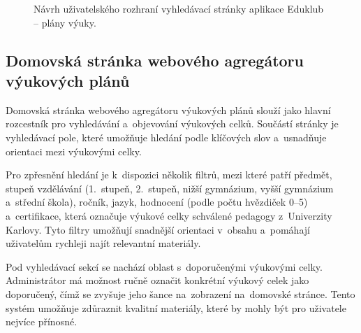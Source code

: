 \documentclass[male,czech,api_bc]{kitheses}
\begin{document}
\begin{figure}[H]
	\centering
	\caption{Návrh uživatelského rozhraní vyhledávací stránky aplikace Eduklub – plány výuky.}
	\label{fig:eduklub-navrh-2}
\end{figure}

\subsection{Domovská stránka webového agregátoru výukových plánů}

Domovská stránka webového agregátoru výukových plánů slouží jako hlavní rozcestník pro vyhledávání a~objevování výukových celků. Součástí stránky je vyhledávací pole, které umožňuje hledání podle klíčových slov a~usnadňuje orientaci mezi výukovými celky.

Pro zpřesnění hledání je k~dispozici několik filtrů, mezi které patří předmět, stupeň vzdělávání (1.~stupeň, 2.~stupeň, nižší gymnázium, vyšší gymnázium a~střední škola), ročník, jazyk, hodnocení (podle počtu hvězdiček 0–5) a~certifikace, která označuje výukové celky schválené pedagogy z~Univerzity Karlovy. Tyto filtry umožňují snadnější orientaci v~obsahu a~pomáhají uživatelům rychleji najít relevantní materiály.

Pod vyhledávací sekcí se nachází oblast s~doporučenými výukovými celky. Administrátor má možnost ručně označit konkrétní výukový celek jako doporučený, čímž se zvyšuje jeho šance na~zobrazení na~domovské stránce. Tento systém umožňuje zdůraznit kvalitní materiály, které by mohly být pro uživatele nejvíce přínosné.
\end{document}
